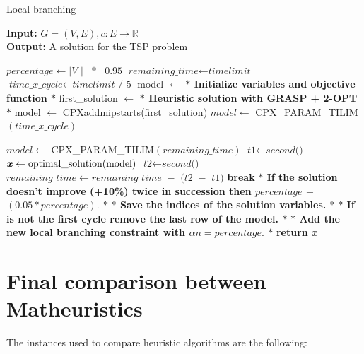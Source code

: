 \begin{algorithm} [H]
    \caption{Local branching}\label{Local branching}
    \hspace*{\algorithmicindent} \textbf{Input:} $G = (V,E) , c : E \rightarrow \mathbb{R}$\\
    \hspace*{\algorithmicindent} \textbf{Output:}  A solution for the TSP problem
    \begin{algorithmic}[1]
    \State $\textit{percentage} \gets \textit{$|$V $|$ $\ast$ $0.95$}$
    \State $\textit{remaining\_time} \gets \textit{timelimit}$
    \State $\textit{time\_x\_cycle} \gets \textit{timelimit / 5}$
    \State model $ \leftarrow $ \textbf{$\ast$ Initialize variables and objective function $\ast$ }
    \State first\_solution $ \leftarrow $ \textbf{$\ast$ Heuristic solution with GRASP + 2-OPT $\ast$ }
    \State model $ \leftarrow $  CPXaddmipstarts(first\_solution)
	\State $ model \gets $ CPX\_PARAM\_TILIM$(\textit{time\_x\_cycle}) $
	
	\Else \State $ model \gets $ CPX\_PARAM\_TILIM$(\textit{remaining\_time}) $
	\EndIf
	\State $\textit{t1} \gets \textit{second()}$
    	\State $\textbf{\textit{x}} \gets \text{optimal\_solution}(\text{model}) $\;
	\State $\textit{t2} \gets \textit{second()}$
	\State $\textit{remaining\_time} \gets \textit{remaining\_time $-$ (t2 $-$ t1)}$
	\State \textbf{break}
	\EndIf
	\State \textbf{$\ast$ If the solution doesn't improve (+10\%) twice in succession then $ percentage $ $ -$= $ (0.05 \ast percentage).$ $\ast$}
	\State \textbf{$\ast$ Save the indices of the solution variables. $\ast$}
	\State \textbf{$\ast$ If is not the first cycle remove the last row of the model. $\ast$}
	\State \textbf{$\ast$ Add the new local branching constraint with $\alpha n = percentage. $ $\ast$}
    \EndWhile
    \State \textbf{return} \textbf{\textit{x}}
    \end{algorithmic}
    \label{alg:lb}
    \end{algorithm}

\section{Final comparison between Matheuristics}
The instances used to compare heuristic algorithms are the following: 

